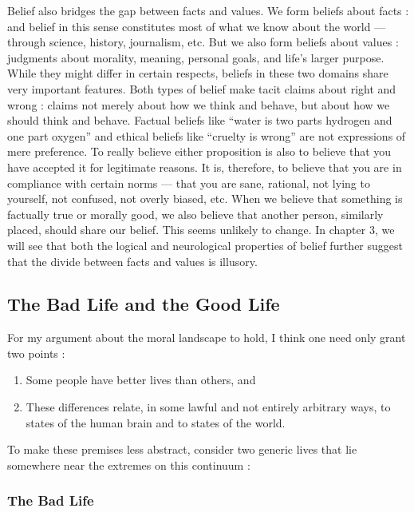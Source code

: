 \documentclass[a4paper,14pt]{extarticle}
\begin{document}
Belief also bridges the gap between facts and values.
We form beliefs about facts :
and belief in this sense constitutes most of what we know about the world --- through science, history, journalism, etc.
But we also form beliefs about values :
judgments about morality, meaning, personal goals, and life's larger purpose.
While they might differ in certain respects, beliefs in these two domains share very important features.
Both types of belief make tacit claims about right and wrong :
claims not merely about how we think and behave, but about how we should think and behave.
Factual beliefs like ``water is two parts hydrogen and one part oxygen'' and ethical beliefs like ``cruelty is wrong'' are not expressions of mere preference.
To really believe either proposition is also to believe that you have accepted it for legitimate reasons.
It is, therefore, to believe that you are in compliance with certain norms --- that you are sane, rational, not lying to yourself, not confused, not overly biased, etc.
When we believe that something is factually true or morally good, we also believe that another person, similarly placed, should share our belief.
This seems unlikely to change.
In chapter 3, we will see that both the logical and neurological properties of belief further suggest that the divide between facts and values is illusory.

\subsection{The Bad Life and the Good Life}

For my argument about the moral landscape to hold, I think one need only grant two points :

\begin{enumerate}
      \item Some people have better lives than others, and
      \item These differences relate, in some lawful and not entirely arbitrary ways, to states of the human brain and to states of the world.
\end{enumerate}

To make these premises less abstract, consider two generic lives that lie somewhere near the extremes on this continuum :

\subsubsection{The Bad Life}
\end{document}
